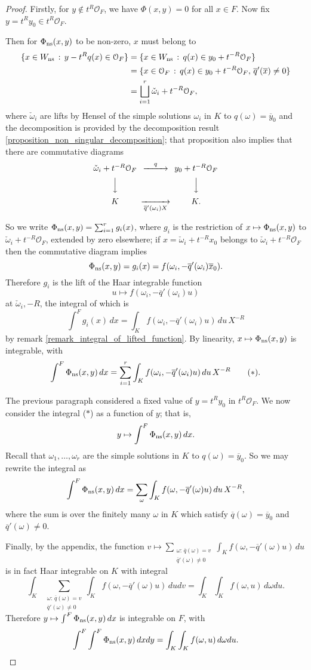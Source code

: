 \documentclass{lmsMODIFIED}
\newcommand{\roi}{\mathcal{O}}
\newcommand{\res}[1]{\overline{#1}}
\newcommand{\w}{\omega}
\newcommand{\sub}[1]{{\mbox{\scriptsize {#1}}}}
\begin{document}
\begin{proof}
Firstly, for $y\notin t^R\roi_{F}$, we have $\Phi(x,y)=0$ for all $x\in F$. Now fix $y=t^Ry_0\in t^R\roi_{F}$.

Then for $\Phi_\sub{ns}(x,y)$ to be non-zero, $x$ must belong to
\begin{align*}
\{x\in W_\sub{ns}\,:\,y-t^Rq(x)\in\roi_{F}\}
	&=\{x\in W_\sub{ns}\,:\,q(x)\in y_0+t^{-R}\roi_{F}\}\\
	&=\{x\in\roi_{F}\,:\,q(x)\in y_0+t^{-R}\roi_{F},\,\res{q}'(\res{x})\neq0\}\\
	&=\bigsqcup_{i=1}^r\check{\w}_i+t^{-R}\roi_{F},
\end{align*}
where $\check{\w}_i$ are lifts by Hensel of the simple solutions $\w_i$ in $ K $ to $q(\w)=\res{y}_0$ and the decomposition is provided by the decomposition result \ref{proposition_non_singular_decomposition}; that proposition also implies that there are commutative diagrams
\[\begin{CD}
\check{\w}_i+t^{-R}\roi_{F} @>q>> y_0+t^{-R}\roi_{F} \\
@VVV  @VVV  \\
 K  @>>\res{q}'(\w_i)X>  K .\\
\end{CD}\]

So we write $\Phi_\sub{ns}(x,y)=\sum_{i=1}^r g_i(x)$, where $g_i$ is the restriction of $x\mapsto\Phi_\sub{ns}(x,y)$ to $\check{\w}_i+t^{-R}\roi_{F}$, extended by zero elsewhere; if $x=\check{\omega}_i+t^{-R}x_0$ belongs to $\check{\w}_i+t^{-R}\roi_{F}$ then the commutative diagram implies \[\Phi_\sub{ns}(x,y)=g_i(x)=f(\w_i,-\res{q}'(\w_i)\res{x}_0).\] Therefore $g_i$ is the lift of the Haar integrable function \[u\mapsto f(\w_i,-\res{q}'(\w_i)u)\] at $\check{\w}_i,-R$, the integral of which is \[\int^F g_i(x)\,dx=\int_K f(\w_i,-\res{q}'(\w_i)u)\,du\,X^{-R}\] by remark \ref{remark_integral_of_lifted_function}. By linearity, $x\mapsto\Phi_\sub{ns}(x,y)$ is integrable, with \[\int^F\Phi_\sub{ns}(x,y)\,dx=\sum_{i=1}^r \int_K f(\w_i,-\res{q}'(\w_i)u)\,du\,X^{-R}\tag{$\ast$}.\]

The previous paragraph considered a fixed value of $y=t^Ry_0$ in $t^R\roi_{F}$. We now consider the integral ($\ast$) as a function of $y$; that is, \[y\mapsto\int^F\Phi_\sub{ns}(x,y)\,dx.\] Recall that $\w_1,\dots,\w_r$ are the simple solutions in $K$ to $q(\w)=\res{y}_0$. So we may rewrite the integral as \[\int^F \Phi_\sub{ns}(x,y)\,dx=\sum_\w \int_K f(\w,-\res{q}'(\w)u)\,du\,X^{-R},\] where the sum is over the finitely many $\w$ in $K$ which satisfy $\res{q}(\w)=\res{y}_0$ and $\res{q}'(\w)\neq0$.

Finally, by the appendix, the function $v\mapsto\sum_{\substack{\w:\,\res{q}(\w)=v\\\res{q}'(\w)\neq0}}\int_K f(\w,-\res{q}'(\w)u)\,du$ is in fact Haar integrable on $K$ with integral \[\int_K\sum_{\substack{\w:\,\res{q}(\w)=v\\\res{q}'(\w)\neq0}}\int_K f(\w,-\res{q}'(\w)u)\,dudv=\int_K\int_K f(\w,u)\,d\w du.\] Therefore $y\mapsto \int^F\Phi_\sub{ns}(x,y)\,dx$ is integrable on $F$, with \[\int^F\int^F\Phi_\sub{ns}(x,y)\,dxdy=\int_K\int_K f(\w,u)\,d\w du.\]
\end{proof}
\end{document}

